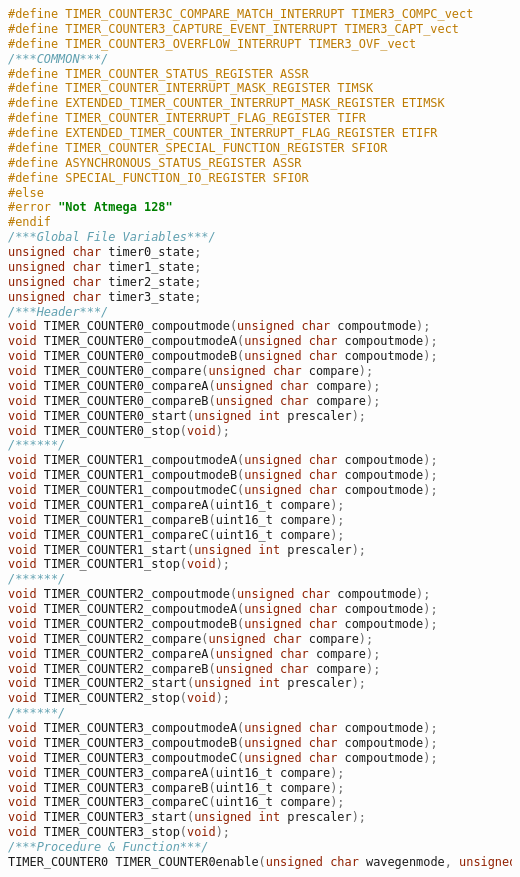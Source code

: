 \begin{lstlisting}[language=C]
#define TIMER_COUNTER3C_COMPARE_MATCH_INTERRUPT TIMER3_COMPC_vect
#define TIMER_COUNTER3_CAPTURE_EVENT_INTERRUPT TIMER3_CAPT_vect
#define TIMER_COUNTER3_OVERFLOW_INTERRUPT TIMER3_OVF_vect
/***COMMON***/
#define TIMER_COUNTER_STATUS_REGISTER ASSR
#define TIMER_COUNTER_INTERRUPT_MASK_REGISTER TIMSK
#define EXTENDED_TIMER_COUNTER_INTERRUPT_MASK_REGISTER ETIMSK
#define TIMER_COUNTER_INTERRUPT_FLAG_REGISTER TIFR
#define EXTENDED_TIMER_COUNTER_INTERRUPT_FLAG_REGISTER ETIFR
#define TIMER_COUNTER_SPECIAL_FUNCTION_REGISTER SFIOR
#define ASYNCHRONOUS_STATUS_REGISTER ASSR
#define SPECIAL_FUNCTION_IO_REGISTER SFIOR
#else
#error "Not Atmega 128"
#endif
/***Global File Variables***/
unsigned char timer0_state;
unsigned char timer1_state;
unsigned char timer2_state;
unsigned char timer3_state;
/***Header***/
void TIMER_COUNTER0_compoutmode(unsigned char compoutmode);
void TIMER_COUNTER0_compoutmodeA(unsigned char compoutmode);
void TIMER_COUNTER0_compoutmodeB(unsigned char compoutmode);
void TIMER_COUNTER0_compare(unsigned char compare);
void TIMER_COUNTER0_compareA(unsigned char compare);
void TIMER_COUNTER0_compareB(unsigned char compare);
void TIMER_COUNTER0_start(unsigned int prescaler);
void TIMER_COUNTER0_stop(void);
/******/
void TIMER_COUNTER1_compoutmodeA(unsigned char compoutmode);
void TIMER_COUNTER1_compoutmodeB(unsigned char compoutmode);
void TIMER_COUNTER1_compoutmodeC(unsigned char compoutmode);
void TIMER_COUNTER1_compareA(uint16_t compare);
void TIMER_COUNTER1_compareB(uint16_t compare);
void TIMER_COUNTER1_compareC(uint16_t compare);
void TIMER_COUNTER1_start(unsigned int prescaler);
void TIMER_COUNTER1_stop(void);
/******/
void TIMER_COUNTER2_compoutmode(unsigned char compoutmode);
void TIMER_COUNTER2_compoutmodeA(unsigned char compoutmode);
void TIMER_COUNTER2_compoutmodeB(unsigned char compoutmode);
void TIMER_COUNTER2_compare(unsigned char compare);
void TIMER_COUNTER2_compareA(unsigned char compare);
void TIMER_COUNTER2_compareB(unsigned char compare);
void TIMER_COUNTER2_start(unsigned int prescaler);
void TIMER_COUNTER2_stop(void);
/******/
void TIMER_COUNTER3_compoutmodeA(unsigned char compoutmode);
void TIMER_COUNTER3_compoutmodeB(unsigned char compoutmode);
void TIMER_COUNTER3_compoutmodeC(unsigned char compoutmode);
void TIMER_COUNTER3_compareA(uint16_t compare);
void TIMER_COUNTER3_compareB(uint16_t compare);
void TIMER_COUNTER3_compareC(uint16_t compare);
void TIMER_COUNTER3_start(unsigned int prescaler);
void TIMER_COUNTER3_stop(void);
/***Procedure & Function***/
TIMER_COUNTER0 TIMER_COUNTER0enable(unsigned char wavegenmode, unsigned char interrupt)

\end{lstlisting}
